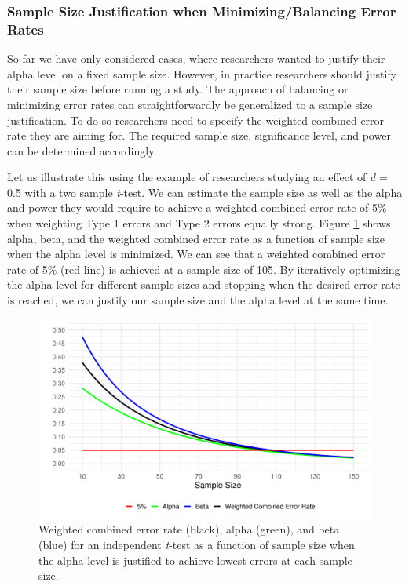 \documentclass[
  english,
  ,man,floatsintext]{apa6}
\begin{document}
\hypertarget{sample-size-justification-when-minimizingbalancing-error-rates}{%
\subsubsection{Sample Size Justification when Minimizing/Balancing Error Rates}\label{sample-size-justification-when-minimizingbalancing-error-rates}}

So far we have only considered cases, where researchers wanted to justify their alpha level on a fixed sample size. However, in practice researchers should justify their sample size before running a study. The approach of balancing or minimizing error rates can straightforwardly be generalized to a sample size justification. To do so researchers need to specify the weighted combined error rate they are aiming for. The required sample size, significance level, and power can be determined accordingly.

Let us illustrate this using the example of researchers studying an effect of \emph{d} = 0.5 with a two sample \emph{t}-test. We can estimate the sample size as well as the alpha and power they would require to achieve a weighted combined error rate of 5\% when weighting Type 1 errors and Type 2 errors equally strong. Figure \ref{fig:error-plot} shows alpha, beta, and the weighted combined error rate as a function of sample size when the alpha level is minimized. We can see that a weighted combined error rate of 5\% (red line) is achieved at a sample size of 105. By iteratively optimizing the alpha level for different sample sizes and stopping when the desired error rate is reached, we can justify our sample size and the alpha level at the same time.

\begin{figure}
\centering
\includegraphics{Justify_in_Practice_files/figure-latex/error-plot-1.pdf}
\caption{\label{fig:error-plot}Weighted combined error rate (black), alpha (green), and beta (blue) for an independent \emph{t}-test as a function of sample size when the alpha level is justified to achieve lowest errors at each sample size.}
\end{figure}
\end{document}
